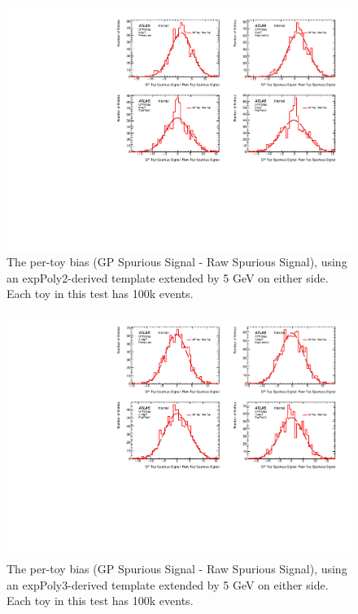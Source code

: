 \begin{figure} 
\begin{center}
  \includegraphics[width=\textwidth]{figures/background/gpr/validation/padded/ToyTest_FitSigBiases_lowpT_100k_noSig}   
\caption{The per-toy bias (GP Spurious Signal - Raw Spurious Signal), using an expPoly2-derived template extended by 5 GeV on either side. Each toy in this test has 100k events.}
\label{fig:bias_padded_lowpt_100k_noSig}
\end{center}
\end{figure}

\begin{figure} 
\begin{center}
  \includegraphics[width=\textwidth]{figures/background/gpr/validation/padded/ToyTest_FitSigBiases_medpT_100k_noSig}   
\caption{The per-toy bias (GP Spurious Signal - Raw Spurious Signal), using an expPoly3-derived template extended by 5 GeV on either side. Each toy in this test has 100k events.}
\label{fig:bias_padded_medpt_100k_noSig}
\end{center}
\end{figure}


